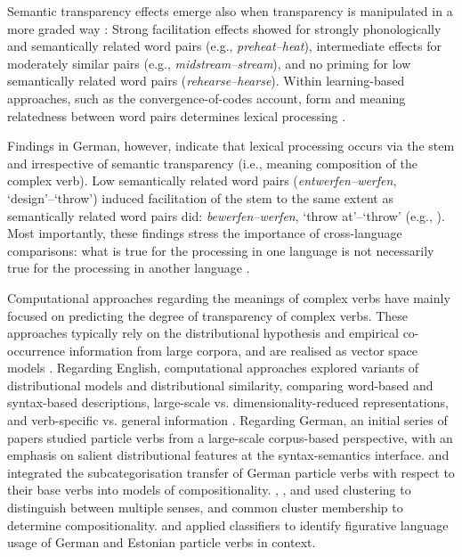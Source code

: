 \documentclass[output=paper]{langsci/langscibook}
\begin{document}
Semantic transparency effects emerge also when transparency is
manipulated in a more graded way \citep{GonnermanEtAl:07}: Strong
facilitation effects showed for strongly phonologically and
semantically related word pairs (e.g., \textit{preheat--heat}),
intermediate effects for moderately similar pairs (e.g.,
\textit{midstream--stream}), and no priming for low semantically
related word pairs (\textit{rehearse--hearse}). Within learning-based
approaches, such as the convergence-of-codes account, form and meaning
relatedness between word pairs determines lexical processing
\citep{Plaut/Gonnerman:00, GonnermanEtAl:07}.

Findings in German, however, indicate that lexical processing occurs via the stem and irrespective of semantic transparency
(i.e., meaning composition of the complex verb). Low semantically
related word pairs (\textit{entwerfen--werfen}, `design'--`throw')
induced facilitation of the stem to the same extent as semantically
related word pairs did: \textit{bewerfen--werfen}, `throw at'--`throw'
(e.g., \citealt{SmolkaEtAl:09, SmolkaEtAl:14, SmolkaEtAl:15,
  SmolkaEtAl:18}). Most importantly, these findings stress the
importance of cross-language comparisons: what is true for the
processing in one language is not necessarily true for the processing
in another language \citep{GuentherEtAl:18}.

Computational approaches regarding the meanings of complex verbs have
mainly focused on predicting the degree of transparency of complex
verbs. These approaches typically rely on the distributional
hypothesis \citep{Harris:54,Firth:57} and empirical co-occurrence
information from large corpora, and are realised as vector space
models \citep{Turney/Pantel:10}. Regarding English, computational
approaches explored variants of distributional models and
distributional similarity, comparing word-based and syntax-based
descriptions, large-scale vs. dimensionality-reduced representations,
and verb-specific vs. general information
\citep[i.a.]{BaldwinEtAl:03,McCarthyEtAl:03,Bannard:05,Cook/Stevenson:06}.
Regarding German, an initial series of papers
\citep{Aldinger:04,SchulteImWalde:04a,SchulteImWalde:05,SchulteImWalde:06c}
studied particle verbs from a large-scale corpus-based perspective,
with an emphasis on salient distributional features at the
syntax-semantics interface. \cite{SchulteImWalde:06c} and
\cite{Bott/SchulteImWalde:18} integrated the subcategorisation
transfer of German particle verbs with respect to their base verbs
into models of
compositionality. \cite{Kuehner/SchulteImWalde:10}, \cite{Bott/SchulteImWalde:17},  and \cite{Koeper/SchulteImWalde:17a}
used clustering to distinguish between multiple senses, and common
cluster membership to determine
compositionality. \cite{Koeper/SchulteImWalde:16b} and
\cite{AedmaaEtAl:18} applied classifiers to identify figurative
language usage of German and Estonian particle verbs in context.
\end{document}
